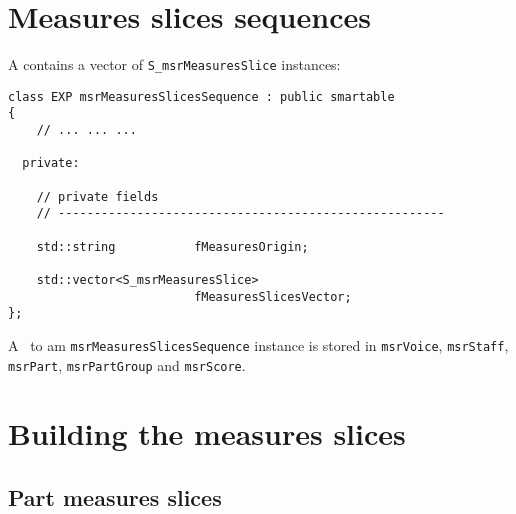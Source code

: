 \section{Measures slices sequences}

A  contains a vector of {\tt S_msrMeasuresSlice} instances:
\begin{lstlisting}[language=CPlusPlus]
class EXP msrMeasuresSlicesSequence : public smartable
{
	// ... ... ...

  private:

    // private fields
    // ------------------------------------------------------

    std::string           fMeasuresOrigin;

    std::vector<S_msrMeasuresSlice>
                          fMeasuresSlicesVector;
};
\end{lstlisting}

A \smart\ to am {\tt msrMeasuresSlicesSequence} instance is stored in {\tt msrVoice}, {\tt msrStaff}, {\tt msrPart}, {\tt msrPartGroup} and {\tt msrScore}.


\section{Building the measures slices}

\subsection{Part measures slices}

